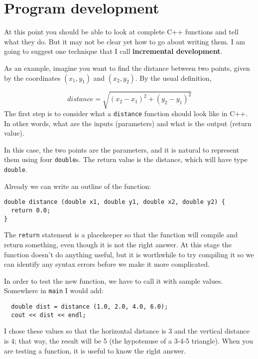 \section{Program development}
\label{distance}

At this point you should be able to look at complete C++ functions
and tell what they do.  But it may not be clear yet how to go
about writing them.  I am going to suggest one technique that
I call {\bf incremental development}.


As an example, imagine you want to find the distance between two
points, given by the coordinates $(x_1, y_1)$ and $(x_2, y_2)$.  By
the usual definition,

\begin{equation}
distance = \sqrt{(x_2 - x_1)^2 + (y_2 - y_1)^2}
\end{equation}
%
The first step is to consider what a {\tt distance} function
should look like in C++.  In other words, what are the inputs
(parameters) and what is the output (return value).

In this case, the two points are the parameters, and it is natural to
represent them using four {\tt double}s.  The return value is the
distance, which will have type {\tt double}.

Already we can write an outline of the function:

\begin{verbatim}
double distance (double x1, double y1, double x2, double y2) {
  return 0.0;
}
\end{verbatim}
%
The {\tt return} statement is a placekeeper so that the function will
compile and return something, even though it is not the right answer.
At this stage the function doesn't do anything useful, but it is
worthwhile to try compiling it so we can identify any syntax errors
before we make it more complicated.

In order to test the new function, we have to call it with
sample values.  Somewhere in {\tt main} I would add:

\begin{verbatim}
  double dist = distance (1.0, 2.0, 4.0, 6.0);
  cout << dist << endl;
\end{verbatim}
%
I chose these values so that the horizontal
distance is 3 and the vertical distance is 4; that way,
the result will be 5 (the hypotenuse of a 3-4-5 triangle).
When you are testing a function, it is useful to know the right
answer.

